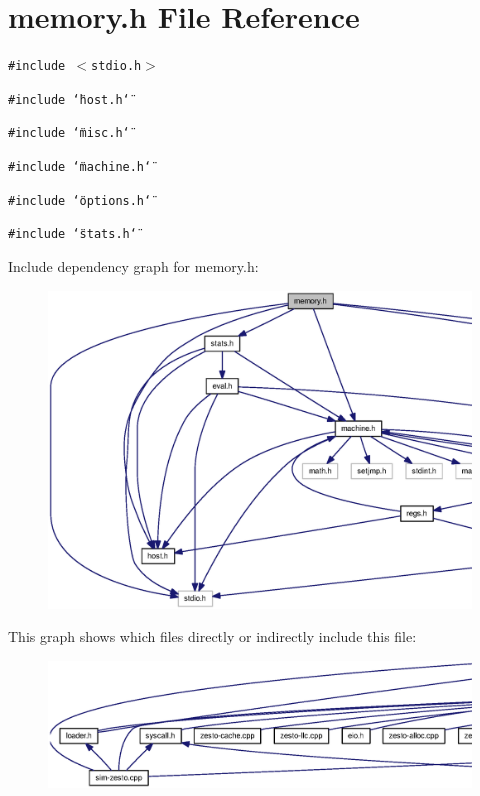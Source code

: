 \section{memory.h File Reference}
\label{memory_8h}
{\tt \#include $<$stdio.h$>$}\par
{\tt \#include \char`\"{}host.h\char`\"{}}\par
{\tt \#include \char`\"{}misc.h\char`\"{}}\par
{\tt \#include \char`\"{}machine.h\char`\"{}}\par
{\tt \#include \char`\"{}options.h\char`\"{}}\par
{\tt \#include \char`\"{}stats.h\char`\"{}}\par


Include dependency graph for memory.h:\nopagebreak
\begin{figure}[H]
\begin{center}
\leavevmode
\includegraphics[width=420pt]{memory_8h__incl}
\end{center}
\end{figure}


This graph shows which files directly or indirectly include this file:\nopagebreak
\begin{figure}[H]
\begin{center}
\leavevmode
\includegraphics[width=420pt]{memory_8h__dep__incl}
\end{center}
\end{figure}
